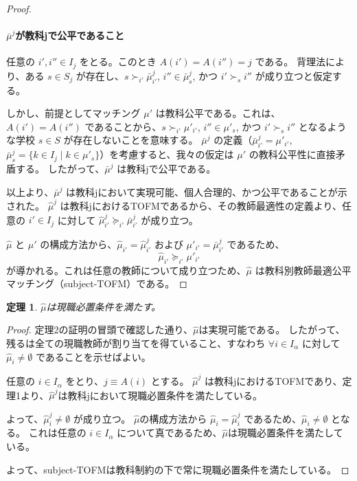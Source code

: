 \documentclass[12pt, a4paper]{article}
\theoremstyle{definition}
\theoremstyle{remark}
\theoremstyle{plain}
\newtheorem{theorem}{定理}
\begin{document}
\begin{proof}
\paragraph{$\bar{\mu}^j$が教科jで公平であること}
任意の $i', i'' \in I_j$ をとる。このとき $A(i')=A(i'')=j$ である。
背理法により、ある $s \in S_j$ が存在し、$s \succ_{i'} \bar{\mu}^j_{i'}$, $i'' \in \bar{\mu}^j_s$, かつ $i' \succ_s i''$ が成り立つと仮定する。

しかし、前提としてマッチング $\mu'$ は教科公平である。これは、$A(i')=A(i'')$ であることから、$s \succ_{i'} \mu'_{i'}$, $i'' \in \mu'_s$, かつ $i' \succ_s i''$ となるような学校 $s \in S$ が存在しないことを意味する。
$\bar{\mu}^j$ の定義（$\bar{\mu}^j_{i'} = \mu'_{i'}$, $\bar{\mu}^j_s = \{k \in I_j \mid k \in \mu'_s\}$）を考慮すると、我々の仮定は $\mu'$ の教科公平性に直接矛盾する。
したがって、$\bar{\mu}^j$ は教科jで公平である。

\vspace{\baselineskip}

以上より、$\bar{\mu}^j$ は教科jにおいて実現可能、個人合理的、かつ公平であることが示された。
$\hat{\mu}^j$ は教科jにおけるTOFMであるから、その教師最適性の定義より、任意の $i' \in I_j$ に対して $\hat{\mu}^j_{i'} \succeq_{i'} \bar{\mu}^j_{i'}$ が成り立つ。

$\hat{\mu}$ と $\mu'$ の構成方法から、$\hat{\mu}_{i'} =\hat{\mu}^j_{i'}$ および $\mu'_{i'} = \bar{\mu}^j_{i'}$ であるため、
\[
 \hat{\mu}_{i'} \succeq_{i'} \mu'_{i'}
\]
が導かれる。これは任意の教師について成り立つため、$\hat{\mu}$ は教科別教師最適公平マッチング（subject-TOFM）である。




\end{proof}



\begin{theorem}
    $\hat{\mu}$は現職必置条件を満たす。
\end{theorem}
\begin{proof}
定理2の証明の冒頭で確認した通り、$\hat{\mu}$は実現可能である。
したがって、残るは全ての現職教師が割り当てを得ていること、すなわち $\forall i \in I_\alpha$ に対して $\hat{\mu}_i \neq \emptyset$ であることを示せばよい。

任意の $i \in I_\alpha$ をとり、$j \equiv A(i)$ とする。
$\hat{\mu}^j$ は教科jにおけるTOFMであり、定理1より、$\hat{\mu}^j$は教科jにおいて現職必置条件を満たしている。

よって、$\hat{\mu}^j_i \neq \emptyset$ が成り立つ。
$\hat{\mu}$の構成方法から $\hat{\mu}_i = \hat{\mu}^j_i$ であるため、$\hat{\mu}_i \neq \emptyset$ となる。
これは任意の $i \in I_\alpha$ について真であるため、$\hat{\mu}$は現職必置条件を満たしている。

よって、subject-TOFMは教科制約の下で常に現職必置条件を満たしている。
\end{proof}
\end{document}
